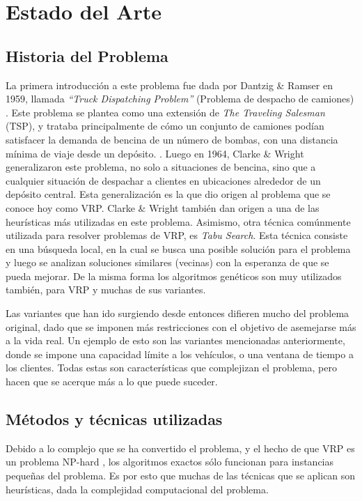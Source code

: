 \documentclass{article}
\begin{document}
\section{Estado del Arte}
\subsection{Historia del Problema}
La primera introducción a este problema fue dada por Dantzig \& Ramser en 1959, llamada \textit{``Truck Dispatching Problem''} (Problema de despacho de camiones) \cite{braekers2016vehicle}. Este problema se plantea como una extensión de \textit{The Traveling Salesman} (TSP), y trataba principalmente de cómo un conjunto de camiones podían satisfacer la demanda de bencina de un número de bombas, con una distancia mínima de viaje desde un depósito. \cite{dantzig1959truck}. Luego en 1964, Clarke \& Wright generalizaron este problema, no solo a situaciones de bencina, sino que a cualquier situación de despachar a clientes en ubicaciones alrededor de un depósito central. Esta generalización es la que dio origen al problema que se conoce hoy como VRP. Clarke \& Wright también dan origen a una de las heurísticas más utilizadas en este problema.  Asimismo, otra técnica comúnmente utilizada para resolver problemas de VRP, es \textit{Tabu Search}\cite{braysy2004evolutionary}. Esta técnica consiste en una búsqueda local, en la cual se busca una posible solución para el problema y luego se analizan soluciones similares (vecinas) con la esperanza de que se pueda mejorar. De la misma forma los algoritmos genéticos son muy utilizados también, para VRP y muchas de sus variantes.

Las variantes que han ido surgiendo desde entonces difieren mucho del problema original, dado que se imponen más restricciones con el objetivo de asemejarse más a la vida real\cite{yan2012model}. Un ejemplo de esto son las variantes mencionadas anteriormente, donde se impone una capacidad límite a los vehículos, o una ventana de tiempo a los clientes. Todas estas son características que complejizan el problema, pero hacen que se acerque más a lo que puede suceder. 

\subsection{Métodos y técnicas utilizadas}
Debido a lo complejo que se ha convertido el problema, y el hecho de que VRP es un problema NP-hard \cite{lenstra1981complexity}, los algoritmos exactos sólo funcionan para instancias pequeñas del problema. Es por esto que muchas de las técnicas que se aplican son heurísticas, dada la complejidad computacional del problema.
\end{document}
